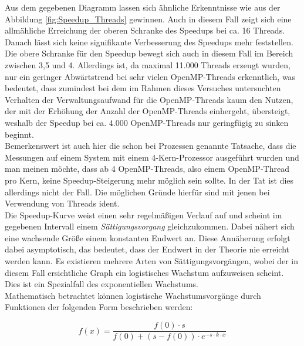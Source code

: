 \begin{description}
						Aus dem gegebenen Diagramm lassen sich ähnliche Erkenntnisse wie aus der Abbildung \ref{fig:Speedup_Threads} gewinnen. Auch in diesem Fall zeigt sich eine allmähliche Erreichung der oberen Schranke des Speedups bei ca. 16 Threads. Danach lässt sich keine signifikante Verbesserung des Speedups mehr feststellen. Die obere Schranke für den Speedup bewegt sich auch in diesem Fall im Bereich zwischen 3,5 und 4. Allerdings ist, da maximal 11.000 Threads erzeugt wurden, nur ein geringer Abwärtstrend bei sehr vielen OpenMP-Threads erkenntlich, was bedeutet, dass zumindest bei dem im Rahmen dieses Versuches untersuchten Verhalten der Verwaltungsaufwand für die OpenMP-Threads kaum den Nutzen, der mit der Erhöhung der Anzahl der OpenMP-Threads einhergeht, übersteigt, weshalb der Speedup bei ca. 4.000 OpenMP-Threads nur geringfügig zu sinken beginnt.\\
						Bemerkenswert ist auch hier die schon bei Prozessen genannte Tatsache, dass die Messungen auf einem System mit einem 4-Kern-Prozessor ausgeführt wurden und man meinen möchte, dass ab 4 OpenMP-Threads, also einem OpenMP-Thread pro Kern, keine Speedup-Steigerung mehr möglich sein sollte. In der Tat ist dies allerdings nicht der Fall. Die möglichen Gründe hierfür sind mit jenen bei Verwendung von Threads ident.\\
						Die Speedup-Kurve weist einen sehr regelmäßigen Verlauf auf und scheint im gegebenen Intervall einem \textit{Sättigungsvorgang} gleichzukommen. Dabei nähert sich eine wachsende Größe einem konstanten Endwert an. Diese Annäherung erfolgt dabei asymptotisch, das bedeutet, dass der Endwert in der Theorie nie erreicht werden kann. Es existieren mehrere Arten von Sättigungsvorgängen, wobei der in diesem Fall ersichtliche Graph ein logistisches Wachstum aufzuweisen scheint. Dies ist ein Spezialfall des exponentiellen Wachstums.\\
						Mathematisch betrachtet können logistische Wachstumsvorgänge durch Funktionen der folgenden Form beschrieben werden:
						
						\[
							f(x) = \frac{f(0) \cdot s}{f(0) + (s - f(0)) \cdot e^{-s \cdot k \cdot x}}
						\]
						

\end{description}
